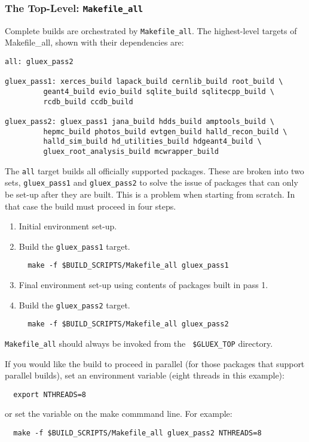 \documentclass[12pt]{article}
\begin{document}
\subsubsection{The Top-Level: {\tt Makefile\_all}}\label{section:makefile-all}

Complete builds are orchestrated by {\tt Makefile\_all}. The highest-level
targets of Makefile\_all, shown with their dependencies are:

\begin{verbatim}
all: gluex_pass2

gluex_pass1: xerces_build lapack_build cernlib_build root_build \
	     geant4_build evio_build sqlite_build sqlitecpp_build \
	     rcdb_build ccdb_build

gluex_pass2: gluex_pass1 jana_build hdds_build amptools_build \
	     hepmc_build photos_build evtgen_build halld_recon_build \
	     halld_sim_build hd_utilities_build hdgeant4_build \
	     gluex_root_analysis_build mcwrapper_build
\end{verbatim}

The {\tt all} target builds all officially supported packages. These
are broken into two sets, {\tt gluex\_pass1} and {\tt gluex\_pass2} to
solve the issue of packages that can only be set-up after they are
built. This is a problem when starting from scratch. In that case the
build must proceed in four steps.

\begin{enumerate}
\item Initial environment set-up.
\item Build the {\tt gluex\_pass1} target.
\begin{verbatim}
  make -f $BUILD_SCRIPTS/Makefile_all gluex_pass1
\end{verbatim}
\item Final environment set-up using contents of packages built in pass 1.
\item Build the {\tt gluex\_pass2} target.
\begin{verbatim}
  make -f $BUILD_SCRIPTS/Makefile_all gluex_pass2
\end{verbatim}
\end{enumerate}

{{\tt Makefile\_all}} should always be invoked from the {\tt
  \$GLUEX\_TOP} directory.

If you would like the build to proceed in parallel (for those packages that support parallel builds), set an environment variable (eight threads in this example):
\begin{verbatim}
  export NTHREADS=8
\end{verbatim}
or set the variable on the make commmand line. For example:
\begin{verbatim}
  make -f $BUILD_SCRIPTS/Makefile_all gluex_pass2 NTHREADS=8
\end{verbatim}
\end{document}
